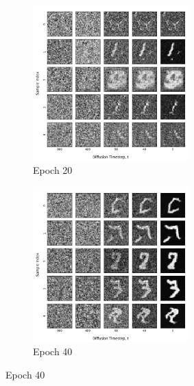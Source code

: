 \documentclass[12pt]{article}
\begin{document}
\begin{figure}[hp]
    \begin{subfigure}{0.49\textwidth}
    \includegraphics[width=0.9\linewidth, height=6cm]{figures/diffusion_plot_2_0020.png}
    \caption{Epoch 20}
    \label{fig:2_20}
    \end{subfigure}
    \begin{subfigure}{0.49\textwidth}
    \includegraphics[width=0.9\linewidth, height=6cm]{figures/diffusion_plot_2_0040.png}
    \caption{Epoch 40}
    \label{fig:2_40}
    \end{subfigure}


\end{figure}
\end{document}
